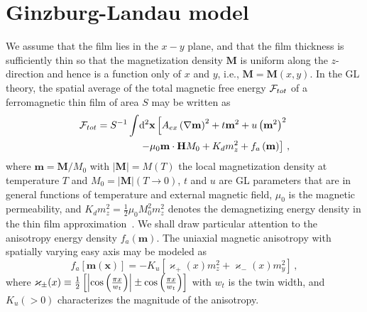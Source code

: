 \documentclass[10pt,onecolumn,prb,aps,notitlepage]{revtex4}
\begin{document}
\section{Ginzburg-Landau model}
We assume that the film lies in the $x-y$ plane, and that the film thickness
is sufficiently thin so that the magnetization density $\mathbf{M}$ is uniform along the
$z$-direction and hence is a function only of $x$ and $y$, i.e., $\mathbf{M=M%
}\left( x,y\right) $. In the GL theory, the spatial average of the total magnetic free
energy ${\cal F}_{tot}$ of a ferromagnetic thin film of area $S$ may be written as
\begin{align}
\mathcal{F}_{tot} =S^{-1}\int &\mathrm{d}^{2}\mathbf{x}\left[ A_{ex}\left(
\nabla \mathbf{m}\right) ^{2}+t\mathbf{m}^{2}+u\left( \mathbf{m}^{2}\right)
^{2}\right. \notag   \\
&\left. -\mu_0\mathbf{m\cdot H}M_{0}+K_{d}m_{z}^{2}+f_{a}\left( \mathbf{m}%
\right) \right] \,, \label{Eq:f_tot}
\end{align}
where $\mathbf{m=M}/M_{0}$ with $|{\mathbf M}|=M(T)$ the local magnetization density at temperature $T$ and $M_0=|{\mathbf M}|(T\to0)$, $t$ and $u$ are
GL parameters that are in general functions of temperature
and external magnetic field, $\mu _{0}$ is the magnetic permeability, and $%
K_{d}m_z^2=\frac{1}{2}\mu _{0}M_{0}^{2}m_z^2$ denotes the demagnetizing energy density
in the thin film approximation~\cite{Harte68JAP_demag-thinFilm}. We shall draw particular attention
to the anisotropy energy density $f_{a}\left( \mathbf{m}\right) $. The
uniaxial magnetic anisotropy with spatially varying easy axis may be modeled
as
\begin{equation}
f_{a}\left[ \mathbf{m}\left( \mathbf{x}\right) \right] =-K_u\left[ \varkappa_{+} \left(
x\right) m_{z}^{2}+\varkappa_{-}\left( x\right) m_{y}^{2} \right]\,,
\label{Eq: f_a[m(r)]}
\end{equation}%
where $\varkappa_{\pm}(x)\equiv \frac{1}{2}\left[ \left\vert \cos \left( \frac{\pi x}{w_{t}}\right) \right\vert \pm  %
\cos \left( \frac{\pi x}{%
w_{t}}\right) \right] $ with $w_{t}$ is
the twin width, and $K_{u}\left( >0\right) $ characterizes the magnitude of the anisotropy.
\end{document}
